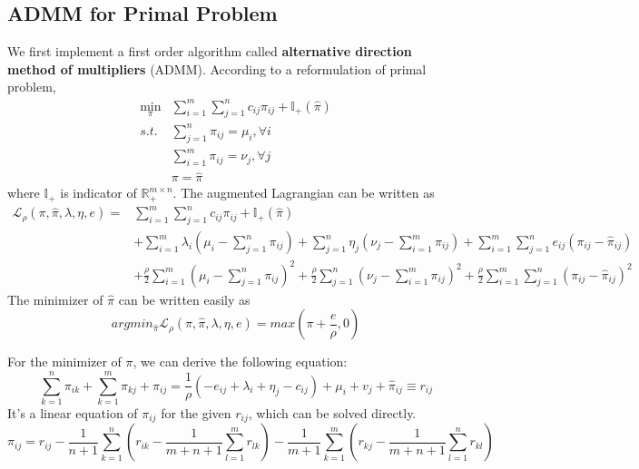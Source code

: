 \documentclass{article}
\begin{document}
\begin{large}
\subsection{ADMM for Primal Problem}
We first implement a first order algorithm called \textbf{alternative direction method of multipliers} (ADMM). According to a reformulation of primal problem, 
\begin{equation} \label{Eq:StdLP_admm_primal}
  \begin{aligned}
  \min_{\pi} & \sum_{i=1}^{m}\sum_{j=1}^{n} c_{ i j } \pi_{ i j }+\mathbb{I}_{+}(\hat{\pi})\\
  s.t. & \sum_{j=1}^{n}\pi_{ i j } = \mu_i, \forall i\\
  & \sum_{i=1}^{m}\pi_{ i j } = \nu_j, \forall j \\
  & \pi=\hat{\pi}
  \end{aligned}
\end{equation}
where $\mathbb{I}_{+}$ is indicator of $\mathbb{R}^{m\times n}_{+}$. The augmented Lagrangian can be written as 
\begin{equation} \label{Eq:admm_primal}
  \begin{aligned}
\mathcal{L}_{\rho}(\pi,\hat{\pi},\lambda,\eta,e)=&\sum_{i=1}^{m}\sum_{j=1}^{n} c_{ i j } \pi_{ i j }+\mathbb{I}_{+}(\hat{\pi})\\
&+\sum_{i=1}^{m}\lambda_{i}\left(\mu_i-\sum_{j=1}^{n}\pi_{ i j }\right)+\sum_{j=1}^{n}\eta_{j}\left(\nu_j-\sum_{i=1}^{m}\pi_{ i j }\right)+\sum_{i=1}^{m}\sum_{j=1}^{n}e_{ij}\left(\pi_{ij}-\hat{\pi}_{ij}\right)\\
&+\frac{\rho}{2}\sum_{i=1}^{m}\left(\mu_i-\sum_{j=1}^{n}\pi_{ i j }\right)^{2}+\frac{\rho}{2}\sum_{j=1}^{n}\left(\nu_j-\sum_{i=1}^{m}\pi_{ i j }\right)^{2}+\frac{\rho}{2}\sum_{i=1}^{m}\sum_{j=1}^{n}\left(\pi_{ij}-\hat{\pi}_{ij}\right)^{2}
\end{aligned}
\end{equation}
The minimizer of $\hat{\pi}$ can be written easily as
\begin{equation}
  argmin_{\hat{\pi}}\mathcal{L}_{\rho}(\pi,\hat{\pi},\lambda,\eta,e)=max\left(\pi+\frac{e}{\rho}, 0\right)
\end{equation}

For the minimizer of $\pi$, we can derive the following equation:
\begin{equation}
  \sum _ { k = 1 } ^ { n } \pi _ { i k } + \sum _ { k = 1 } ^ { m } \pi _ { k j } + \pi_ { i j } = \frac { 1 } { \rho } \left(-e _ { i j } + \lambda _ { i } + \eta _ { j } - c _ { i j } \right) + \mu _ { i } + v _ { j } + \hat{ \pi} _ { i j } \equiv r _ { i j }
\end{equation}
It's a linear equation of $\pi_{ij}$ for the given $r_{ij}$,  which can be solved directly.
\begin{equation}
\pi_ { i j } = r _ { i j } - \frac { 1 } { n + 1 } \sum _ { k = 1 } ^ { n } \left( r _ { i k } - \frac { 1 } { m + n + 1 } \sum _ { l = 1 } ^ { m } r _ { l k } \right) - \frac { 1 } { m + 1 } \sum _ { k = 1 } ^ { m } \left( r _ { k j } - \frac { 1 } { m + n + 1 } \sum _ { l = 1 } ^ { n } r _ { k l } \right)
\end{equation}


\end{large}
\end{document}

